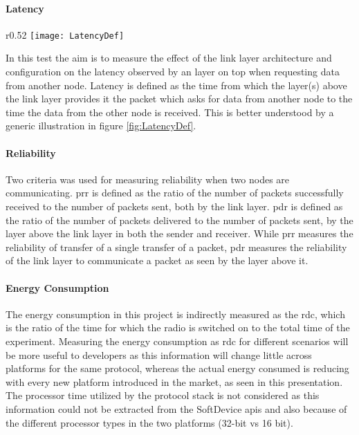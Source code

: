 \paragraph{Latency}  \label{6para:latency}
\begin{wrapfigure}{r}{0.52\textwidth}
	\vspace{-10pt}
	\centering
	\capstart
	\texttt{[image: LatencyDef]}
	\caption{Illustration of latency measurement}
	\vspace{-10pt}
	\label{fig:LatencyDef}
\end{wrapfigure}
In this test the aim is to measure the effect of the link layer architecture and configuration on the latency observed by an layer on top when requesting data from another node. Latency is defined as the time from which the layer(s) above the link layer provides it the packet which asks for data from another node to the time the data from the other node is received. This is better understood by a generic illustration in figure \ref{fig:LatencyDef}.

\paragraph{Reliability}
Two criteria was used for measuring reliability when two nodes are communicating. \gls{prr} is defined as the ratio of the number of packets successfully received to the number of packets sent, both by the link layer. \gls{pdr} is defined as the ratio of the number of packets delivered to the number of packets sent, by the layer above the link layer in both the sender and receiver. While \gls{prr} measures the reliability of transfer of a single transfer of a packet, \gls{pdr} measures the reliability of the link layer to communicate a packet as seen by the layer above it.

\paragraph{Energy Consumption}
The energy consumption in this project is indirectly measured as the \acrfull{rdc}, which is the ratio of the time for which the radio is switched on to the total time of the experiment. Measuring the energy consumption as \gls{rdc} for different scenarios will be more useful to developers as this information will change little across platforms for the same protocol, whereas the actual energy consumed is reducing with every new platform introduced in the market, as seen in this presentation\cite{Bernegger2014}. The processor time utilized by the protocol stack is not considered as this information could not be extracted from the SoftDevice \glspl{api} and also because of the different processor types in the two platforms (32-bit vs 16 bit). 

